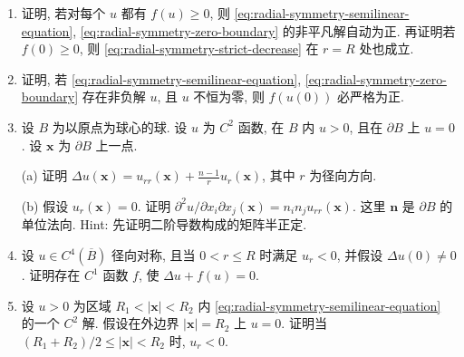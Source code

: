 \begin{enumerate}[label=\thesection.\arabic*.,ref=\thesection.\arabic*,start=17,series=book-problems]

\item\label{ex:nonnegative-nonlinearity-positive-solution} 证明, 若对每个 $u$ 都有 $f(u)\geq0$, 则 \eqref{eq:radial-symmetry-semilinear-equation}, \eqref{eq:radial-symmetry-zero-boundary} 的非平凡解自动为正. 再证明若 $f(0)\geq0$, 则 \eqref{eq:radial-symmetry-strict-decrease} 在 $r=R$ 处也成立.

\item\label{ex:radial-center-nonlinearity-positive} 证明, 若 \eqref{eq:radial-symmetry-semilinear-equation}, \eqref{eq:radial-symmetry-zero-boundary} 存在非负解 $u$, 且 $u$ 不恒为零, 则 $f(u(0))$ 必严格为正.

\item\label{ex:boundary-hessian-radial-identity} 设 $B$ 为以原点为球心的球. 设 $u$ 为 $C^2$ 函数, 在 $B$ 内 $u>0$, 且在 $\partial B$ 上 $u=0$. 设 $\bm{x}$ 为 $\partial B$ 上一点.

(a) 证明 $\Delta u(\bm{x})=u_{rr}(\bm{x})+\frac{n-1}{r}u_r(\bm{x})$, 其中 $r$ 为径向方向.

(b) 假设 $u_r(\bm{x})=0$. 证明 $\partial^2u/\partial x_i\partial x_j(\bm{x})=n_in_ju_{rr}(\bm{x})$. 这里 $\bm{n}$ 是 $\partial B$ 的单位法向. Hint: 先证明二阶导数构成的矩阵半正定.

\item\label{ex:radial-profile-semilinear-construction} 设 $u\in C^4(\overline B)$ 径向对称, 且当 $0<r\leq R$ 时满足 $u_r<0$, 并假设 $\Delta u(0)\ne0$. 证明存在 $C^1$ 函数 $f$, 使 $\Delta u+f(u)=0$.

\item\label{ex:annular-positive-solution-outward-monotonicity} 设 $u>0$ 为区域 $R_1<|\bm{x}|<R_2$ 内 \eqref{eq:radial-symmetry-semilinear-equation} 的一个 $C^2$ 解. 假设在外边界 $|\bm{x}|=R_2$ 上 $u=0$. 证明当 $(R_1+R_2)/2\leq|\bm{x}|<R_2$ 时, $u_r<0$.

\end{enumerate}
